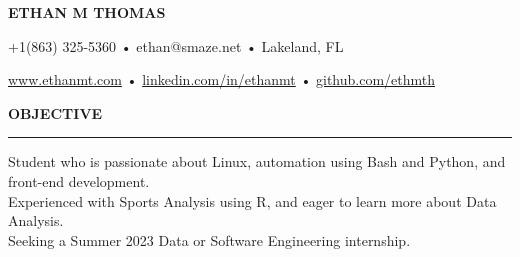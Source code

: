 \documentclass[10pt,letterpaper]{article}
\begin{document}
\begingroup
\centerline{\MakeUppercase{\LARGE\bf Ethan M Thomas}}
\medskip
\endgroup

\begingroup
\centerline{+1(863) 325-5360 • ethan@smaze.net • Lakeland, FL}
\endgroup
\par

\begingroup
\centerline{\href{www.ethanmt.com}{www.ethanmt.com} • \href{https://www.linkedin.com/in/ethanmt/}{linkedin.com/in/ethanmt} • \href{https://github.com/ethmth}{github.com/ethmth}}
\endgroup
\par


\iffalse
    \medskip
    \MakeUppercase{{\bf Objective}} %
    \medskip
    \hrule %
    \begin{list}{}{\setlength{\leftmargin}{0em}}
        \item
              {Student who is passionate about Linux, automation using Bash and Python, and front-end development.
              \\ Seeking a Summer 2023 Software Engineering internship.}
    \end{list}
\fi



\medskip
\MakeUppercase{{\bf Objective}} %
\medskip
\hrule %
\begin{list}{}{\setlength{\leftmargin}{0em}}
    \item
          {Student who is passionate about Linux, automation using Bash and Python, and front-end development.
          \\ Experienced with Sports Analysis using R, and eager to learn more about Data Analysis.
          \\ Seeking a Summer 2023 Data or Software Engineering internship.}
\end{list}


\end{document}

